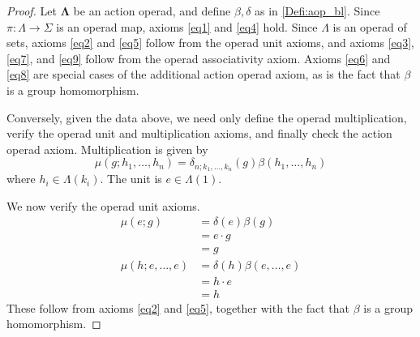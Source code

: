 \documentclass{amsbook} %
\newcommand{\mb}{\mathbf}
\numberwithin{section}{chapter}
\begin{document}
\begin{proof}
Let $\mb{\Lambda}$ be an action operad, and define $\beta, \delta$ as in \cref{Defi:aop_bl}.  Since $\pi \colon \Lambda \rightarrow \Sigma$ is an operad map, axioms \eqref{eq1} and \eqref{eq4} hold.  Since $\Lambda$ is an operad of sets, axioms \eqref{eq2} and \eqref{eq5} follow from the operad unit axioms, and axioms \eqref{eq3}, \eqref{eq7}, and \eqref{eq9} follow from the operad associativity axiom.  Axioms \eqref{eq6} and \eqref{eq8} are special cases of the additional action operad axiom, as is the fact that $\beta$ is a group homomorphism.

Conversely, given the data above, we need only define the operad multiplication, verify the operad unit and multiplication axioms,  and finally check the action operad axiom.  Multiplication is given by
  \[
    \mu(g; h_{1}, \ldots, h_{n}) = \delta_{n; k_{1}, \ldots, k_{n}}(g) \beta(h_{1}, \ldots, h_{n})
  \]
where $h_{i} \in \Lambda(k_{i})$.  The unit is $e \in \Lambda(1)$.

We now verify the operad unit axioms.
  \begin{align*}
    \mu(e; g) &= \delta(e)\beta(g) \\
    &= e \cdot g \\
    &= g \\
    \mu(h; e, \ldots, e) &= \delta(h)\beta(e, \ldots, e) \\
    &= h \cdot e \\
    &= h
  \end{align*}
These follow from axioms \eqref{eq2} and \eqref{eq5}, together with the fact that $\beta$ is a group homomorphism.


\end{proof}
\end{document}
